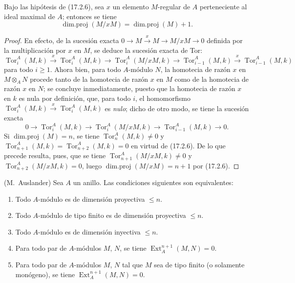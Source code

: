 \begin{corollary}[17.2.7]
\label{0.17.2.7-fr}
Bajo las hipótesis de \textup{(17.2.6)}, sea $x$ un elemento $M$-regular de $A$
perteneciente al ideal maximal de $A$; entonces se tiene
\begin{equation}
\label{0.17.2.7.1-fr}
\tag{17.2.7.1}
  \operatorname{dim.proj}(M/xM)=\operatorname{dim.proj}(M)+1.
\end{equation}
\end{corollary}

\begin{proof}
En efecto, de la sucesión exacta
$0\longrightarrow M\xrightarrow{x}M\longrightarrow M/xM\longrightarrow0$
definida por la multiplicación por $x$ en $M$, se deduce la sucesión exacta de
Tor:
\[
  \operatorname{Tor}^A_i(M,k)\xrightarrow{x}
  \operatorname{Tor}^A_i(M,k)\longrightarrow
  \operatorname{Tor}^A_i(M/xM,k)\longrightarrow
  \operatorname{Tor}^A_{i-1}(M,k)\xrightarrow{x}
  \operatorname{Tor}^A_{i-1}(M,k)
\]
para todo $i\geq1$. Ahora bien, para todo $A$-módulo $N$, la homotecia de razón $x$
en $M\otimes_A N$ procede tanto de la homotecia de razón $x$ en
$M$ como de la homotecia de razón $x$ en $N$; se concluye inmediatamente,
puesto que la homotecia de razón $x$ en $k$ es nula por definición, que,
para todo $i$, el homomorfismo
$\operatorname{Tor}^A_i(M,k)\xrightarrow{x}\operatorname{Tor}^A_i(M,k)$ es
\emph{nulo}; dicho de otro modo, se tiene la sucesión exacta
\[
  0\longrightarrow\operatorname{Tor}^A_i(M,k)\longrightarrow
  \operatorname{Tor}^A_i(M/xM,k)\longrightarrow
  \operatorname{Tor}^A_{i-1}(M,k)\longrightarrow0.
\]
Si $\operatorname{dim.proj}(M)=n$, se tiene
$\operatorname{Tor}^A_n(M,k)\neq0$ y
$\operatorname{Tor}^A_{n+1}(M,k)=\operatorname{Tor}^A_{n+2}(M,k)=0$ en virtud
de (17.2.6). De lo que precede resulta, pues, que se tiene
$\operatorname{Tor}^A_{n+1}(M/xM,k)\neq0$ y
$\operatorname{Tor}^A_{n+2}(M/xM,k)=0$, luego
$\operatorname{dim.proj}(M/xM)=n+1$ por (17.2.6).
\end{proof}

\begin{proposition}[17.2.8]
\label{0.17.2.8-fr}
\textnormal{(M.~Auslander)} Sea $A$ un anillo. Las condiciones siguientes son
equivalentes:
\begin{enumerate}
  \item[\rm a)] Todo $A$-módulo es de dimensión proyectiva $\leq n$.
  \item[\rm a')] Todo $A$-módulo de tipo finito es de dimensión proyectiva
  $\leq n$.
  \item[\rm b)] Todo $A$-módulo es de dimensión inyectiva $\leq n$.
  \item[\rm c)] Para todo par de $A$-módulos $M$, $N$, se tiene
  $\operatorname{Ext}^{n+1}_A(M,N)=0$.
  \item[\rm c')] Para todo par de $A$-módulos $M$, $N$ tal que $M$ sea de
  tipo finito \textup{(o solamente} monógeno\textup{)}, se tiene
  $\operatorname{Ext}^{n+1}_A(M,N)=0$.
\end{enumerate}
\end{proposition}

